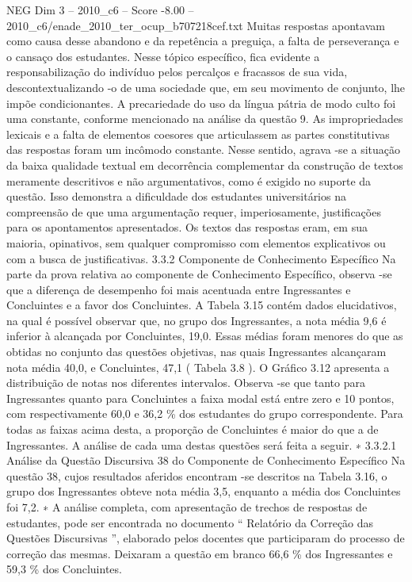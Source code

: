 \begin{textsample}{NEG Dim 3 – 2010\_c6 – Score -8.00 – 2010\_c6/enade\_2010\_ter\_ocup\_b707218cef.txt}
Muitas respostas apontavam como causa desse abandono e da repetência a preguiça, a falta de perseverança e o cansaço dos estudantes.
Nesse tópico específico, fica evidente a responsabilização do indivíduo pelos percalços e fracassos de sua vida, descontextualizando -o de uma sociedade que, em seu movimento de conjunto, lhe impõe condicionantes.
A precariedade do uso da língua pátria de modo culto foi uma constante, conforme mencionado na análise da questão 9.
As impropriedades lexicais e a falta de elementos coesores que articulassem as partes constitutivas das respostas foram um incômodo constante.
Nesse sentido, agrava -se a situação da baixa qualidade textual em decorrência complementar da construção de textos meramente descritivos e não argumentativos, como é exigido no suporte da questão.
Isso demonstra a dificuldade dos estudantes universitários na compreensão de que uma argumentação requer, imperiosamente, justificações para os apontamentos apresentados.
Os textos das respostas eram, em sua maioria, opinativos, sem qualquer compromisso com elementos explicativos ou com a busca de justificativas. 3.3.2 Componente de Conhecimento Específico Na parte da prova relativa ao componente de Conhecimento Específico, observa -se que a diferença de desempenho foi mais acentuada entre Ingressantes e Concluintes e a favor dos Concluintes.
A Tabela 3.15 contém dados elucidativos, na qual é possível observar que, no grupo dos Ingressantes, a nota média 9,6 é inferior à alcançada por Concluintes, 19,0.
Essas médias foram menores do que as obtidas no conjunto das questões objetivas, nas quais Ingressantes alcançaram nota média 40,0, e Concluintes, 47,1 ( Tabela 3.8 ).
O Gráfico 3.12 apresenta a distribuição de notas nos diferentes intervalos.
Observa -se que tanto para Ingressantes quanto para Concluintes a faixa modal está entre zero e 10 pontos, com respectivamente 60,0 e 36,2 \% dos estudantes do grupo correspondente.
Para todas as faixas acima desta, a proporção de Concluintes é maior do que a de Ingressantes.
A análise de cada uma destas questões será feita a seguir. ∗ 3.3.2.1 Análise da Questão Discursiva 38 do Componente de Conhecimento Específico Na questão 38, cujos resultados aferidos encontram -se descritos na Tabela 3.16, o grupo dos Ingressantes obteve nota média 3,5, enquanto a média dos Concluintes foi 7,2. ∗ A análise completa, com apresentação de trechos de respostas de estudantes, pode ser encontrada no documento “ Relatório da Correção das Questões Discursivas ”, elaborado pelos docentes que participaram do processo de correção das mesmas.
Deixaram a questão em branco 66,6 \% dos Ingressantes e 59,3 \% dos Concluintes.

\end{textsample}

